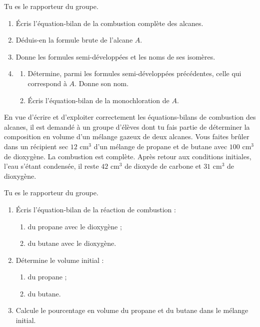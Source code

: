 Tu es le rapporteur du groupe.
\begin{enumerate}
  \item Écris l'équation-bilan de la combustion complète des alcanes.
  \item Déduis-en la formule brute de l'alcane $A$.
  \item Donne les formules semi-développées et les noms de ses isomères.
  \item
  \begin{enumerate}[label=4.\arabic*.]
    \item Détermine, parmi les formules semi-développées précédentes, celle qui correspond à $A$.
          Donne son nom.
    \item Écris l'équation-bilan de la monochloration de $A$.
  \end{enumerate}
\end{enumerate}

En vue d'écrire et d'exploiter correctement les équations-bilans de combustion des alcanes, il est
demandé à un groupe d'élèves dont tu fais partie de déterminer la composition en volume d'un mélange
gazeux de deux alcanes. Vous faites brûler dans un récipient sec $12$ cm$^3$ d'un mélange de propane et
de butane avec $100$ cm$^3$ de dioxygène. La combustion est complète. Après retour aux conditions
initiales, l'eau s'étant condensée, il reste $42$ cm$^3$ de dioxyde de carbone et $31$ cm$^3$ de
dioxygène.

Tu es le rapporteur du groupe.
\begin{enumerate}
  \item Écris l'équation-bilan de la réaction de combustion :
  \begin{enumerate}[label=1.\arabic*.]
    \item du propane avec le dioxygène ;
    \item du butane avec le dioxygène.
  \end{enumerate}
  \item Détermine le volume initial :
  \begin{enumerate}[label=2.\arabic*.]
    \item du propane ;
    \item du butane.
  \end{enumerate}
  \item Calcule le pourcentage en volume du propane et du butane dans le mélange initial.
\end{enumerate}


